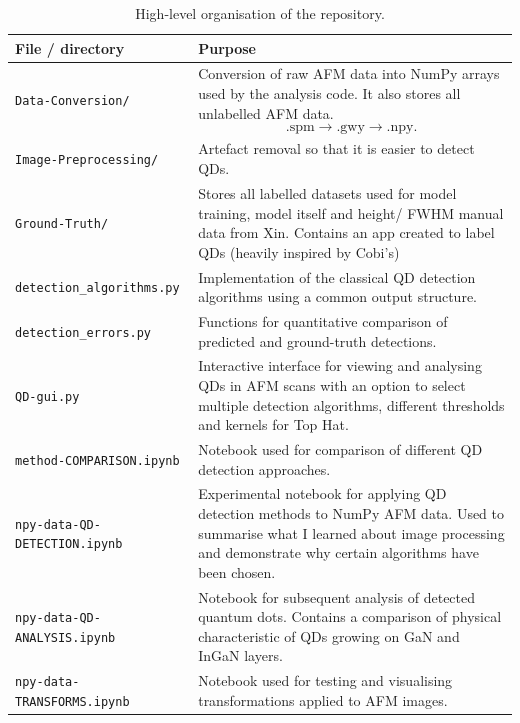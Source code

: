 \documentclass[11pt,a4paper]{article}
\begin{document}
\begin{table}[H]
\centering
\small
\begin{tabular}{p{} p{}}
\toprule
\textbf{File / directory} & \textbf{Purpose} \\
\midrule

\texttt{Data-Conversion/}
&
Conversion of raw AFM data into NumPy arrays used by the analysis code. It also stores all unlabelled AFM data.
\[
\mathrm{.spm}
\rightarrow
\mathrm{.gwy}
\rightarrow
\mathrm{.npy}.
\]
\\[2mm]

\texttt{Image-Preprocessing/}
&
Artefact removal so that it is easier to detect QDs.
\\[2mm]

\texttt{Ground-Truth/}
&
Stores all labelled datasets used for model training, model itself and height/ FWHM manual data from Xin. Contains an app created to label QDs (heavily inspired by Cobi's)
\\[2mm]

\texttt{detection\_algorithms.py}
&
Implementation of the classical QD detection algorithms using a common output structure.
\\[2mm]

\texttt{detection\_errors.py}
&
Functions for quantitative comparison of predicted and ground-truth detections.
\\[2mm]

\texttt{QD-gui.py}
&
Interactive interface for viewing and analysing QDs in AFM scans with an option to select multiple detection algorithms, different thresholds and kernels for Top Hat.
\\[2mm]

\texttt{method-COMPARISON.ipynb}
&
Notebook used for comparison of different QD detection approaches.
\\[2mm]

\texttt{npy-data-QD-DETECTION.ipynb}
&
Experimental notebook for applying QD detection methods to NumPy AFM data. Used to summarise what I learned about image processing and demonstrate why certain algorithms have been chosen.
\\[2mm]

\texttt{npy-data-QD-ANALYSIS.ipynb}
&
Notebook for subsequent analysis of detected quantum dots. Contains a comparison of physical characteristic of QDs growing on GaN and InGaN layers.
\\[2mm]

\texttt{npy-data-TRANSFORMS.ipynb}
&
Notebook used for testing and visualising transformations applied to AFM images.
\\

\bottomrule
\end{tabular}
\caption{High-level organisation of the repository.}
\end{table}
\end{document}
